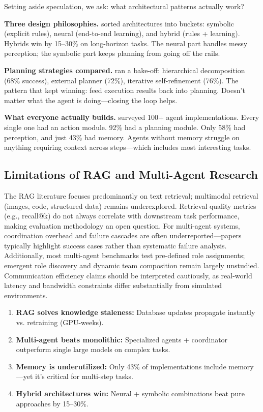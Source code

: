 \documentclass[12pt,a4paper]{report}
\theoremstyle{definition}
\begin{document}
Setting aside speculation, we ask: what architectural patterns actually work?

\textbf{Three design philosophies.} \citet{sumers2023cognitive} sorted architectures into buckets: symbolic (explicit rules), neural (end-to-end learning), and hybrid (rules + learning). Hybrids win by 15--30\% on long-horizon tasks. The neural part handles messy perception; the symbolic part keeps planning from going off the rails.

\textbf{Planning strategies compared.} \citet{wang2024planning} ran a bake-off: hierarchical decomposition (68\% success), external planner (72\%), iterative self-refinement (76\%). The pattern that kept winning: feed execution results back into planning. Doesn't matter what the agent is doing---closing the loop helps.

\textbf{What everyone actually builds.} \citet{xi2023rise} surveyed 100+ agent implementations. Every single one had an action module. 92\% had a planning module. Only 58\% had perception, and just 43\% had memory. Agents without memory struggle on anything requiring context across steps---which includes most interesting tasks.

\subsection{Limitations of RAG and Multi-Agent Research}
The RAG literature focuses predominantly on text retrieval; multimodal retrieval (images, code, structured data) remains underexplored. Retrieval quality metrics (e.g., recall@k) do not always correlate with downstream task performance, making evaluation methodology an open question. For multi-agent systems, coordination overhead and failure cascades are often underreported---papers typically highlight success cases rather than systematic failure analysis. Additionally, most multi-agent benchmarks test pre-defined role assignments; emergent role discovery and dynamic team composition remain largely unstudied. Communication efficiency claims should be interpreted cautiously, as real-world latency and bandwidth constraints differ substantially from simulated environments.

\begin{tcolorbox}[colback=orange!5!white, colframe=orange!60!black, title=\textbf{Chapter 4 Key Takeaways}]
\begin{enumerate}
    \item \textbf{RAG solves knowledge staleness:} Database updates propagate instantly vs. retraining (GPU-weeks).
    \item \textbf{Multi-agent beats monolithic:} Specialized agents + coordinator outperform single large models on complex tasks.
    \item \textbf{Memory is underutilized:} Only 43\% of implementations include memory---yet it's critical for multi-step tasks.
    \item \textbf{Hybrid architectures win:} Neural + symbolic combinations beat pure approaches by 15--30\%.
\end{enumerate}
\end{tcolorbox}
\end{document}
